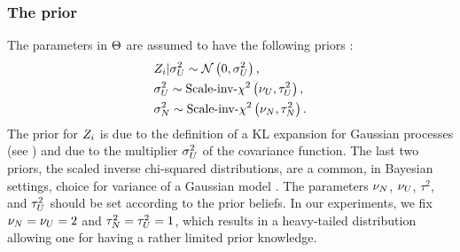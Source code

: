 \subsubsection{The prior}
The parameters in $\Theta$ are assumed to have the following priors \cite{marzouk2009}:
\begin{align*}
  & Z_i | \sigma^2_U \sim \mathcal{N}\left( 0, \sigma^2_U \right), \\
  & \sigma^2_U \sim \text{Scale-inv-}\chi^2\left( \nu_U, \tau^2_U \right), \\
  & \sigma^2_N \sim \text{Scale-inv-}\chi^2\left( \nu_N, \tau^2_N \right).
\end{align*}
The prior for $Z_i$ is due to the definition of a KL expansion for Gaussian processes (see ) and due to the multiplier $\sigma^2_U$ of the covariance function. The last two priors, the scaled inverse chi-squared distributions, are a common, in Bayesian settings, choice for variance of a Gaussian model \cite{gelman2004}. The parameters $\nu_N$, $\nu_U$, $\tau^2$, and $\tau^2_U$ should be set according to the prior beliefs. In our experiments, we fix $\nu_N = \nu_U = 2$ and $\tau^2_N = \tau^2_U = 1$, which results in a heavy-tailed distribution allowing one for having a rather limited prior knowledge.

